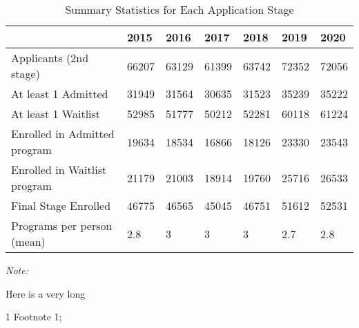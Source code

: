 \begin{table}
\centering
\caption{Summary Statistics for Each Application Stage}
\centering
\begin{threeparttable}
\begin{tabular}[t]{lllllll}
\toprule
 & 2015 & 2016 & 2017 & 2018 & 2019 & 2020\\
\midrule
Applicants (2nd stage) & 66207 & 63129 & 61399 & 63742 & 72352 & 72056\\
At least 1 Admitted & 31949 & 31564 & 30635 & 31523 & 35239 & 35222\\
At least 1 Waitlist & 52985 & 51777 & 50212 & 52281 & 60118 & 61224\\
Enrolled in Admitted program & 19634 & 18534 & 16866 & 18126 & 23330 & 23543\\
Enrolled in Waitlist program & 21179 & 21003 & 18914 & 19760 & 25716 & 26533\\
\addlinespace
Final Stage Enrolled & 46775 & 46565 & 45045 & 46751 & 51612 & 52531\\
Programs per person (mean) & 2.8 & 3 & 3 & 3 & 2.7 & 2.8\\
\bottomrule
\end{tabular}
\begin{tablenotes}
\item \textit{Note: } 
\item Here is a very long
\item[1] Footnote 1; 
\end{tablenotes}
\end{threeparttable}
\end{table}
